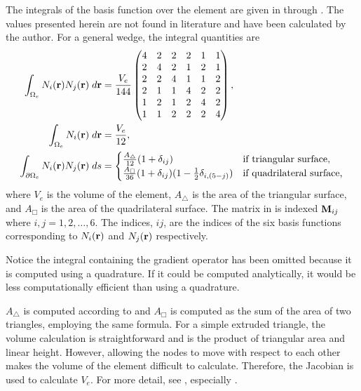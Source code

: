       The integrals of the basis function over the element are given in
       through . The values
      presented herein are not found in literature and have been calculated by
      the author. For a general wedge, the integral quantities are
      \begin{align}
        \label{eq:bigmat}
        \int_{\Omega_e} N_i(\mathbf{r}) N_j(\mathbf{r}) \;d\mathbf{r} &= 
          \frac{V_e}{144}
          \begin{pmatrix}
            4 & 2 & 2 & 2 & 1 & 1 \\
            2 & 4 & 2 & 1 & 2 & 1 \\
            2 & 2 & 4 & 1 & 1 & 2 \\
            2 & 1 & 1 & 4 & 2 & 2 \\
            1 & 2 & 1 & 2 & 4 & 2 \\
            1 & 1 & 2 & 2 & 2 & 4 
          \end{pmatrix}, \\
        \int_{\Omega_e} N_i(\mathbf{r}) \;d\mathbf{r} &= \frac{V_e}{12}, \\
        \label{eq:wedge_surface_integral}
        \int_{\partial \Omega_e} N_i(\mathbf{r}) 
          N_j(\mathbf{r}) \;ds &= 
          \begin{cases}
            \frac{A_{\triangle}}{12}(1+\delta_{ij}) & 
              \text{if triangular surface,} \\
            \frac{A_{\Box}}{36}(1+\delta_{ij})(1-\frac{1}{2} \delta_{i,(5-j)}) &
              \text{if quadrilateral surface,}
          \end{cases}
      \end{align}
      where $V_e$ is the volume of the element, $A_{\triangle}$ is the area of 
      the triangular surface, and $A_{\Box}$ is the area of the quadrilateral
      surface. The matrix in  is indexed $\mathbf{M}_{ij}$ where
      ${i,j} = 1, 2, \ldots, 6$. The indices, $ij$, are the indices of the six 
      basis functions corresponding to $N_i(\mathbf{r})$ and $N_j(\mathbf{r})$ 
      respectively.

      Notice the
      integral containing the gradient operator has been omitted because it is
      computed using a quadrature. If it could be computed analytically, it
      would be less computationally efficient than using a quadrature.
      
      $A_{\triangle}$ is computed according to  and
      $A_{\Box}$ is computed as the sum of the area of two triangles, employing
      the same formula. For a simple extruded triangle, the volume calculation 
      is straightforward and is the product of triangular area and linear 
      height. However, allowing the nodes to move with respect to each other 
      makes the volume of the element difficult to calculate. Therefore, the 
      Jacobian is used to calculate $V_e$. For more detail, see 
      , especially .

